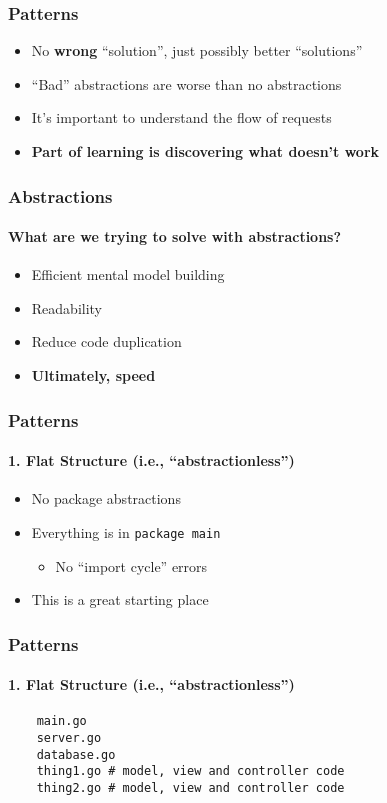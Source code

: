 
\begin{frame}[fragile]
  \frametitle{Patterns}
  \begin{itemize}
    \item No \textbf{wrong} ``solution'', just possibly better ``solutions''
    \pause
    \item ``Bad'' abstractions are worse than no abstractions
    \pause
    \item It's important to understand the flow of requests
    \pause
    \item \textbf{Part of learning is discovering what doesn't work}
  \end{itemize}
\end{frame}

{
  \color{solarizedBase2}
\begin{frame}[fragile]
  \frametitle{Abstractions}
  \framesubtitle{What are we trying to solve with abstractions?}

  \begin{itemize}
    \item Efficient mental model building
    \item Readability
    \item Reduce code duplication
    \item \textbf{Ultimately, speed}
  \end{itemize}
\end{frame}
}

\begin{frame}[fragile]
  \frametitle{Patterns}
  \framesubtitle{1. Flat Structure (i.e., ``abstractionless'')}

  \begin{itemize}
    \item No package abstractions
    \pause
    \item Everything is in \texttt{package main}
    \begin{itemize}
      \item No ``import cycle'' errors
    \end{itemize}
    \pause
    \item This is a great starting place
  \end{itemize}
\end{frame}

\begin{frame}[fragile]
  \frametitle{Patterns}
  \framesubtitle{1. Flat Structure (i.e., ``abstractionless'')}

  \begin{verbatim}
    main.go
    server.go
    database.go
    thing1.go # model, view and controller code
    thing2.go # model, view and controller code
  \end{verbatim}
\end{frame}

